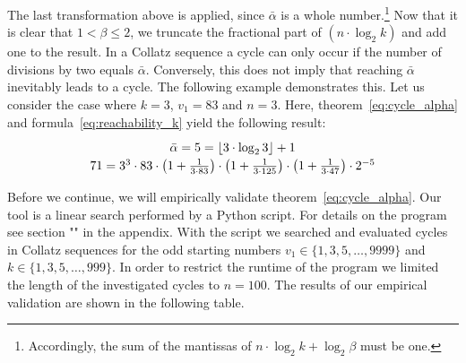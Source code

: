 \documentclass{SciPress_2015}
\begin{document}
The last transformation above is applied, since $\bar\alpha$ is a whole number.\footnote{Accordingly, the sum of the mantissas of $n\cdot\log_2k+\log_2\beta$ must be one.} Now that it is clear that $1<\beta\le2$, we truncate the fractional part of $(n\cdot \log_2k)$ and add one to the result. In a Collatz sequence a cycle can only occur if the number of divisions by two equals $\bar\alpha$. Conversely, this does not imply that reaching $\bar\alpha$ inevitably leads to a cycle. The following example demonstrates this. Let us consider the case where $k=3$, $v_1=83$ and $n=3$. Here, theorem~\ref{eq:cycle_alpha} and formula~\ref{eq:reachability_k} yield the following result:
\[
\def\arraystretch{1.2}\begin{array}{c}
\bar\alpha=5=\lfloor3\cdot\log_23\rfloor+1\\
71=3^3\cdot83\cdot\left(1+\frac{1}{3\cdot83}\right)\cdot\left(1+\frac{1}{3\cdot125}\right)\cdot\left(1+\frac{1}{3\cdot47}\right)\cdot2^{-5}
\end{array}
\]

\par
Before we continue, we will empirically validate theorem~\ref{eq:cycle_alpha}. Our tool is a linear search performed by a Python script. For details on the program see section "" in the appendix. With the script we searched and evaluated cycles in Collatz sequences for the odd starting numbers $v_1\in\{1,3,5,\ldots,9999\}$ and $k\in\{1,3,5,\ldots,999\}$. In order to restrict the runtime of the program we limited the length of the investigated cycles to $n=100$. The results of our empirical validation are shown in the following table.
\end{document}
